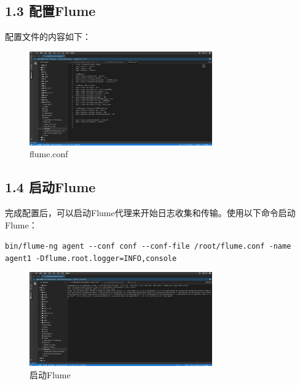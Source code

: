 \documentclass{article}
\begin{document}
\subsection*{1.3 配置Flume}
配置文件的内容如下：
\begin{figure}[H]
    \centering
    \includegraphics[width=0.7\textwidth]{./pic/14.png}
    \caption{flume.conf}
\end{figure}
\subsection*{1.4 启动Flume}
完成配置后，可以启动Flume代理来开始日志收集和传输。使用以下命令启动Flume：\par
\lstinline[style=Style]|bin/flume-ng agent --conf conf --conf-file /root/flume.conf -name agent1 -Dflume.root.logger=INFO,console|
\begin{figure}[H]
    \centering
    \includegraphics[width=0.7\textwidth]{./pic/16.png}
    \caption{启动Flume}
\end{figure}
\end{document}
